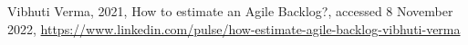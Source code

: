 {\begin{latin}
\begin{thebibliography}{9}
		Vibhuti Verma,
		2021,
		How to estimate an Agile Backlog?,
		accessed 8 November 2022,
		\url{	https://www.linkedin.com/pulse/how-estimate-agile-backlog-vibhuti-verma}

		
	\end{thebibliography}
	\endgroup
\end{latin}

}